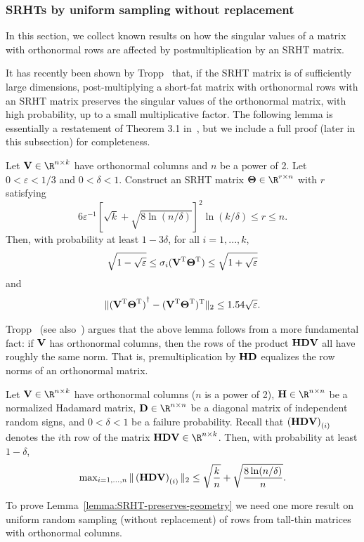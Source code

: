 \subsubsection{SRHTs by uniform sampling without replacement}

In this section, we collect known results on how the singular values of a matrix with orthonormal rows are affected
by postmultiplication by an SRHT matrix.

It has recently been shown by Tropp~\cite{Tro11} that, if the SRHT matrix is of sufficiently large dimensions,
post-multiplying a short-fat matrix with orthonormal rows with an SRHT matrix preserves
the singular values of the orthonormal matrix, with high probability, up to a small multiplicative factor.
The following lemma is essentially a restatement of Theorem 3.1 in~\cite{Tro11}, but we include a full proof (later in this subsection) for completeness.
\begin{lemma}
\label{lemma:SRHT-preserves-geometry}
Let $\matV \in \R^{n \times k}$ have orthonormal columns and $n$ be a power of 2. Let $0 < \varepsilon < 1/3$ and $0 < \delta < 1.$
Construct an SRHT matrix $\matTh \in \R^{r \times n}$ with $r$ satisfying
\begin{equation}\label{eqn:r2}
6\varepsilon^{-1}\left[\sqrt{k} + \sqrt{8\ln(n/\delta)} \right]^2 \ln (k/\delta) \leq r \leq n.
\end{equation}
Then, with probability at least $1 - 3\delta$, for all $i=1,...,k$,
$$
\sqrt{1 - \sqrt{\varepsilon}} \le \sigma_i( {\bm{\mathrm{V}}} ^{\textsc{T}} {\bm{\mathrm{\Theta}}}^{\textsc{T}} ) \le \sqrt{1 + \sqrt{\varepsilon}}
$$
and
$$
\mbox{}\| {({\bm{\mathrm{V}}}^{\textsc{T}} {\bm{\mathrm{\Theta}}}^{\textsc{T}})}^\dagger - ({\bm{\mathrm{V}}}^{\textsc{T}} {\bm{\mathrm{\Theta}}}^{\textsc{T}})^{\textsc{T}} \|_2 \le 1.54 \sqrt{\varepsilon}.
$$
\end{lemma}
Tropp~\cite{Tro11} (see also~\cite{AC06}) argues that the above lemma follows from a more fundamental fact: if ${\bm{\mathrm{V}}}$ has orthonormal columns,
then the rows of the product ${\bm{\mathrm{H}}}{\bm{\mathrm{D}}} {\bm{\mathrm{V}}}$ all have roughly the same norm. That is, premultiplication by ${\bm{\mathrm{H}}}{\bm{\mathrm{D}}}$
equalizes the row norms of an orthonormal matrix.

\begin{lemma}
\label{prop:SRHT-equalizes-columns-of-orthonormal-matrices}
Let $\matV \in \R^{n \times k}$ have orthonormal columns ($n$ is a power of 2), $\matH \in \R^{n \times n}$ be a normalized Hadamard matrix, $\matD \in \R^{n \times n}$ be a diagonal matrix of independent random signs, and $0 < \delta < 1$ be a failure probability. Recall that $\left({\bm{\mathrm{H}}} {\bm{\mathrm{D}}}  {\bm{\mathrm{V}}} \right)_{(i)}$ denotes the $i$th row of the matrix $\matH \matD  \matV \in \R^{n \times k}$. Then, with probability at least $1-\delta$,
\[
\max\nolimits_{i=1,...,n} \mbox{}\|\left({\bm{\mathrm{H}}} {\bm{\mathrm{D}}} {\bm{\mathrm{V}}} \right)_{(i)}\|_2 \le \sqrt{{k\over n}}  + \sqrt{ {8 \ln(n/\delta)\over n}}.
\]
\end{lemma}
To prove Lemma~\ref{lemma:SRHT-preserves-geometry} we need one more result on uniform random sampling (without replacement) of rows
from tall-thin matrices with orthonormal columns.

